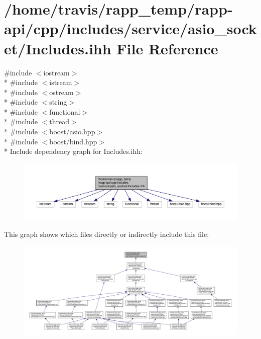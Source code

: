 \hypertarget{service_2asio__socket_2Includes_8ihh}{\section{/home/travis/rapp\-\_\-temp/rapp-\/api/cpp/includes/service/asio\-\_\-socket/\-Includes.ihh File Reference}
\label{service_2asio__socket_2Includes_8ihh}
}
{\ttfamily \#include $<$iostream$>$}\\*
{\ttfamily \#include $<$istream$>$}\\*
{\ttfamily \#include $<$ostream$>$}\\*
{\ttfamily \#include $<$string$>$}\\*
{\ttfamily \#include $<$functional$>$}\\*
{\ttfamily \#include $<$thread$>$}\\*
{\ttfamily \#include $<$boost/asio.\-hpp$>$}\\*
{\ttfamily \#include $<$boost/bind.\-hpp$>$}\\*
Include dependency graph for Includes.\-ihh\-:
\nopagebreak
\begin{figure}[H]
\begin{center}
\leavevmode
\includegraphics[width=350pt]{service_2asio__socket_2Includes_8ihh__incl}
\end{center}
\end{figure}
This graph shows which files directly or indirectly include this file\-:
\nopagebreak
\begin{figure}[H]
\begin{center}
\leavevmode
\includegraphics[width=350pt]{service_2asio__socket_2Includes_8ihh__dep__incl}
\end{center}
\end{figure}
